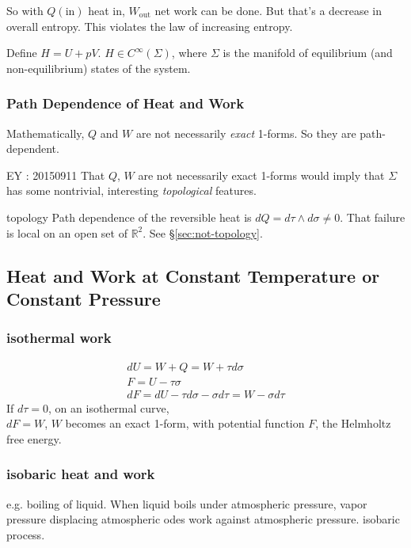 So with $Q(\text{in})$ heat in, $W_{\text{out}}$ net work can be done.  But that's a decrease in overall entropy.  This violates the law of increasing entropy.  

Define $H = U + pV$.  $H \in C^{\infty}(\Sigma)$, where $\Sigma$ is the manifold of equilibrium (and non-equilibrium) states of the system.  

\subsubsection*{Path Dependence of Heat and Work}

Mathematically, $Q$ and $W$ are not necessarily \emph{exact} 1-forms.  So they are path-dependent.

EY : 20150911 That $Q$, $W$ are not necessarily exact 1-forms would imply that $\Sigma$ has some nontrivial, interesting \emph{topological} features.
\begin{correction}{topology}
Path dependence of the reversible heat is $dQ = d\tau\wedge d\sigma \neq 0$.
That failure is local on an open set of $\mathbb{R}^2$.
See \S\ref{sec:not-topology}.
\end{correction}  

\subsection*{Heat and Work at Constant Temperature or Constant Pressure}

\subsubsection*{isothermal work}

\[
\begin{gathered}
  dU = W + Q = W + \tau d\sigma \\ 
  F = U-\tau \sigma \\ 
  dF = dU - \tau d\sigma - \sigma d\tau = W -\sigma d\tau
\end{gathered}
\]
If $d\tau =0$, on an isothermal curve, \\
$dF = W$, $W$ becomes an exact 1-form, with potential function $F$, the Helmholtz free energy.

\subsubsection*{isobaric heat and work}

e.g. boiling of liquid.  When liquid boils under atmospheric pressure, vapor pressure displacing atmospheric odes work against atmospheric pressure.  isobaric process.

